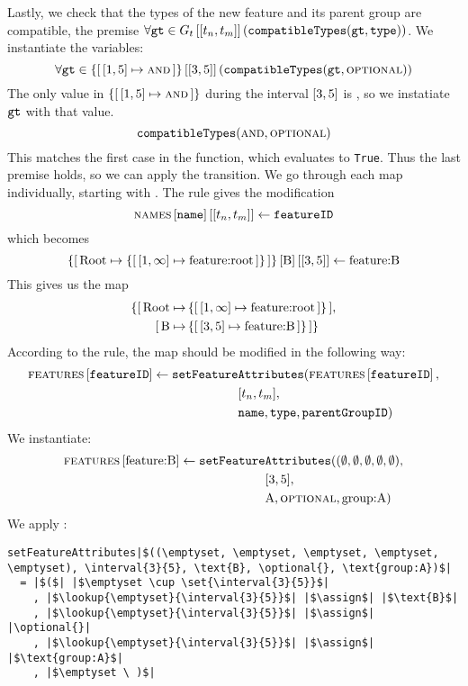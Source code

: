Lastly, we check that the types of the new feature and its parent group are compatible, the premise $\forall \var{gt} \in \lookup{G_t}{\interval{t_n}{t_m}} (\var{compatibleTypes}(\var{gt}, \var{type}))$. We instantiate the variables:
\[
  \forall \var{gt} \in \lookup{\set{\intervalmapping{1}{5}{\andtype}}}{\interval{3}{5}}(\var{compatibleTypes}(\var{gt}, \optional{}))
\]
The only value in $\set{\intervalmapping{1}{5}{\andtype}}$ during the interval $\interval{3}{5}$ is \andtype, so we instatiate $\texttt{gt}$ with that value.
\[
  \texttt{compatibleTypes}(\textsc{and}{}, \textsc{optional}{})
\]
This matches the first case in the  function, which evaluates to \texttt{True}. Thus the last premise holds, so we can apply the transition. We go through each map individually, starting with \names{}. The rule gives the modification
\[
  \lookup{\lookup{\names{}}{\var{name}}}{\interval{t_n}{t_m}} \assign \var{featureID}
\]
which becomes
\[
  \lookup{\lookup{\{  \mapping{\text{Root}}{\set{\intervalmapping{1}{\forever}{\text{feature:root}}}}\}}{\text{B}}}{\interval{3}{5}} \assign \text{feature:B}
\]
This gives us the map
\begin{align*}
  \{\mapping{\text{Root}}{& \set{\intervalmapping{1}{\forever}{\text{feature:root}}}}, \\
   \mapping{\text{B}}{& \set{\intervalmapping{3}{5}{\text{feature:B}}}}\} 
\end{align*}
According to the rule, the \features{} map should be modified in the following way:
\begin{align*}
  \lookup{\features{}}{\var{featureID}} \assign \var{setFeature}&\var{Attributes}(\lookup{\features{}}{\var{featureID}}, \\
                           &\interval{t_n}{t_m},\\
                           &\var{name}, \var{type}, \var{parentGroupID})
\end{align*}
We instantiate:
\begin{align*}
  \lookup{\features{}}{\text{feature:B}} \assign \var{setFeature}&\var{Attributes}((\emptyset, \emptyset, \emptyset, \emptyset, \emptyset), \\
                           &\interval{3}{5},\\
                           &\text{A}, \optional{}, \text{group:A})
\end{align*}
We apply :
\begin{verbatim}
setFeatureAttributes|$((\emptyset, \emptyset, \emptyset, \emptyset, \emptyset), \interval{3}{5}, \text{B}, \optional{}, \text{group:A})$|
  = |$($| |$\emptyset \cup \set{\interval{3}{5}}$|
    , |$\lookup{\emptyset}{\interval{3}{5}}$| |$\assign$| |$\text{B}$|
    , |$\lookup{\emptyset}{\interval{3}{5}}$| |$\assign$| |\optional{}|
    , |$\lookup{\emptyset}{\interval{3}{5}}$| |$\assign$| |$\text{group:A}$|
    , |$\emptyset \ )$|
 \end{verbatim}
